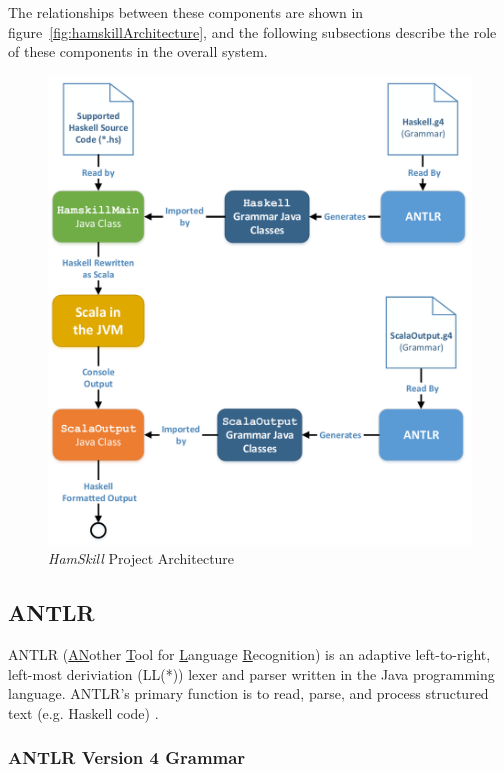 \documentclass{report}
\begin{document}
The relationships between these components are shown in figure~\ref{fig:hamskillArchitecture}, and the following subsections describe the role of these components in the overall system.

\begin{figure}[ht!]
	\centering
		\includegraphics[width=1.0\textwidth]{images/cs252_project_diagram_cropped.pdf}
	\caption{\textit{HamSkill} Project Architecture}
\end{figure}\label{fig:hamskillArchitecture}

\subsection{ANTLR}

ANTLR (\underline{AN}other \underline{T}ool for \underline{L}anguage \underline{R}ecognition) is an adaptive left-to-right, left-most deriviation (LL(*)) lexer and parser written in the Java programming language.  ANTLR's primary function is to read, parse, and process structured text (e.g. Haskell code) \cite{antlrDefinitiveReference}.  

\subsubsection{ANTLR Version 4 Grammar}
\end{document}
